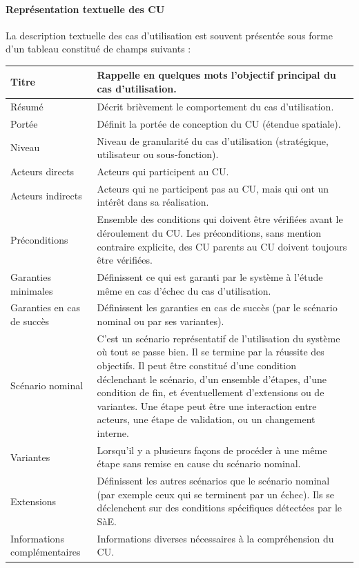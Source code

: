 \paragraph{Représentation textuelle des CU}
La description textuelle des cas d'utilisation est souvent présentée sous forme d'un tableau constitué de champs suivants : 
\begin{longtable}[l]{|p{3cm}|p{11.7cm}|}
    \hline
        Titre & Rappelle en quelques mots l'objectif principal du cas d'utilisation.\\
    \hline
        Résumé & Décrit brièvement le comportement du cas d'utilisation.\\
    \hline
        Portée & Définit la portée de conception du CU (étendue spatiale).\\
    \hline
        Niveau & Niveau de granularité du cas d'utilisation (stratégique, utilisateur ou sous-fonction).\\
    \hline
        Acteurs directs & Acteurs qui participent au CU.\\
    \hline 
        Acteurs indirects & Acteurs qui ne participent pas au CU, mais qui ont un intérêt dans sa réalisation.\\
    \hline
        Préconditions & Ensemble des conditions qui doivent être vérifiées avant le déroulement du CU. Les
        préconditions, sans mention contraire explicite, des CU parents au CU doivent
        toujours être vérifiées.\\
    \hline
        Garanties \newline minimales & Définissent ce qui est garanti par le système à l'étude même en cas d'échec du cas d'utilisation.\\
    \hline
        Garanties en cas de succès & Définissent les garanties en cas de succès (par le scénario nominal ou par ses
        variantes). \\
    \hline
        Scénario nominal & C'est un scénario représentatif de l'utilisation du système où tout se passe bien. Il
        se termine par la réussite des objectifs. Il peut être constitué d'une condition
        déclenchant le scénario, d'un ensemble d'étapes, d'une condition de fin, et
        éventuellement d'extensions ou de variantes. Une étape peut être une interaction
        entre acteurs, une étape de validation, ou un changement interne.\\
    \hline
        Variantes & Lorsqu'il y a plusieurs façons de procéder à une même étape sans remise en cause
        du scénario nominal.\\
    \hline
        Extensions & Définissent les autres scénarios que le scénario nominal (par exemple ceux qui se
        terminent par un échec). Ils se déclenchent sur des conditions spécifiques
        détectées par le SàE.\\
    \hline
        Informations \newline complémentaires & Informations diverses nécessaires à la compréhension du CU. \\
    \hline
\end{longtable}